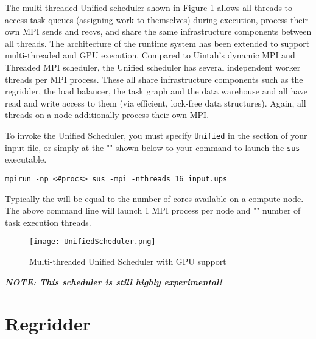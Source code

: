The multi-threaded Unified scheduler shown in Figure \ref{fig:UnifiedScheduler}
allows all threads to access task queues (assigning work to themselves)
during execution, process their own MPI sends and recvs, and share the same
infrastructure components between all threads. The architecture of the runtime
system has been extended to support multi-threaded and GPU execution. Compared
to Uintah’s dynamic MPI and Threaded MPI scheduler, the Unified scheduler has
several independent worker threads per MPI process. These all share
infrastructure components such as the regridder, the load balancer, the task
graph and the data warehouse and all have read and write access to them (via
efficient, lock-free data structures). Again, all threads on a node
additionally process their own MPI.

To invoke the Unified Scheduler, you must specify \texttt{Unified} in the
 section of your input file, or simply at the
"" shown below to your command to launch the \texttt{sus}
executable.

\begin{Verbatim}[fontsize=\footnotesize]
mpirun -np <#procs> sus -mpi -nthreads 16 input.ups
\end{Verbatim}

Typically the  will be equal to the number of cores available on a
compute node. The above command line will launch 1 MPI process per node and
"" number of task execution threads.

\begin{figure}[H]
  \centering
  \texttt{[image: UnifiedScheduler.png]}
  \caption{Multi-threaded Unified Scheduler with GPU support}
  \label{fig:UnifiedScheduler}
\end{figure}

\textbf{\emph{NOTE: This scheduler is still highly experimental!}}
%
%


\section{Regridder}

